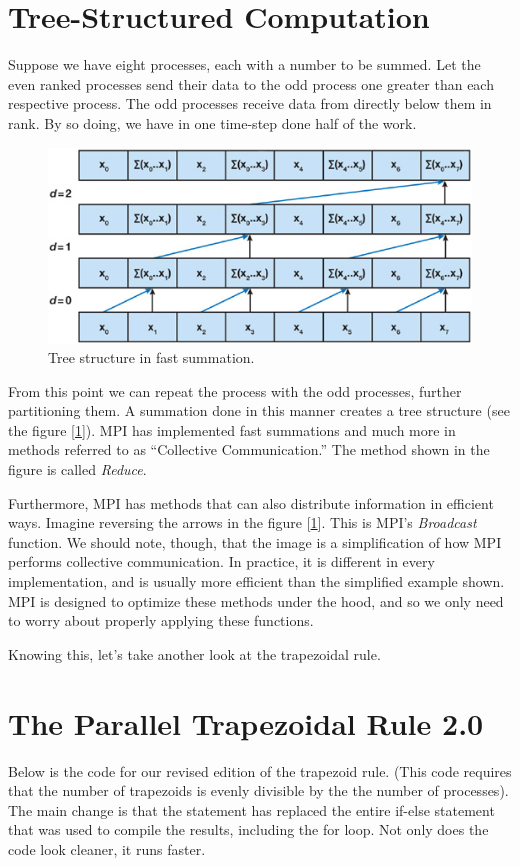 \section*{Tree-Structured Computation}
Suppose we have eight processes, each with a number to be summed. Let the even ranked processes send their data to the odd process one greater than each respective process. The odd processes receive data from directly below them in rank. By so doing, we have in one time-step done half of the work.

\begin{figure}
\centering
\includegraphics[width=.9\textwidth]{fastSum.png}
\caption{Tree structure in fast summation.}
\label{fig:fast_sum}
\end{figure}


From this point we can repeat the process with the odd processes, further partitioning them. A summation done in this manner creates a tree structure (see the figure [\ref{fig:fast_sum}]). MPI has implemented fast summations and much more in methods referred to as ``Collective Communication.'' The method shown in the figure is called \emph{Reduce}.

Furthermore, MPI has methods that can also distribute information in efficient ways. Imagine reversing the arrows in the figure [\ref{fig:fast_sum}]. This is MPI's \emph{Broadcast} function. We should note, though, that the image is a simplification of how MPI performs collective communication. In practice, it is different in every implementation, and is usually more efficient than the simplified example shown. MPI is designed to optimize these methods under the hood, and so we only need to worry about properly applying these functions.

Knowing this, let's take another look at the trapezoidal rule.


\section*{The Parallel Trapezoidal Rule 2.0}
Below is the code for our revised edition of the trapezoid rule. (This code requires that the number of trapezoids is evenly divisible by the the number of processes). The main change is that the statement  has replaced the entire if-else statement that was used to compile the results, including the for loop. Not only does the code look cleaner, it runs faster.

